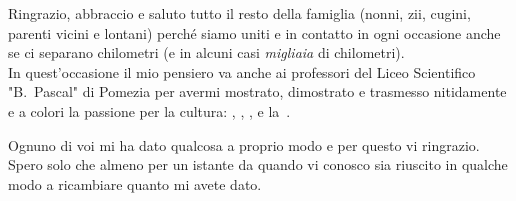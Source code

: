 Ringrazio, abbraccio e saluto tutto il resto della famiglia (nonni, zii, cugini, parenti vicini e lontani) perché siamo uniti e in contatto in ogni occasione anche se ci separano chilometri (e in alcuni casi \emph{migliaia} di chilometri).\\
In quest'occasione il mio pensiero va anche ai professori del Liceo Scientifico "B.~Pascal" di Pomezia per avermi mostrato, dimostrato e trasmesso nitidamente e a colori la passione per la cultura: , , ,  e la~.

Ognuno di voi mi ha dato qualcosa a proprio modo e per questo vi ringrazio. Spero solo che almeno per un istante da quando vi conosco sia riuscito in qualche modo a ricambiare quanto mi avete dato.

\newpage
\mbox{}
\thispagestyle{empty}
